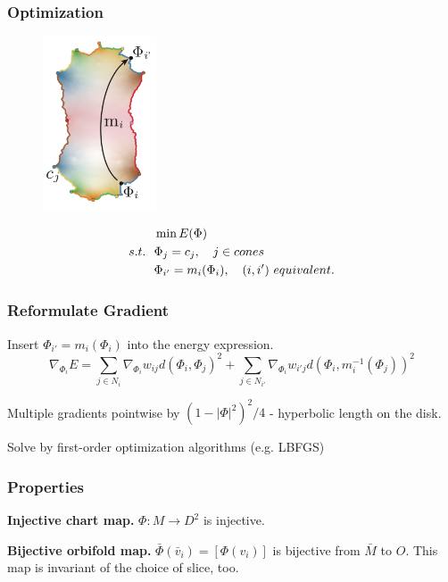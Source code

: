 \documentclass{beamer}
\begin{document}
\begin{frame}
\frametitle{Optimization}
\begin{figure}
\includegraphics[width=0.3\textwidth]{images/optimize-hyperbolic}
\end{figure}
\begin{equation}
\begin{split}
&\min E(\Phi)\\
s.t. \ \  & \Phi_j = c_j,\ \ \  \hfill j\in cones\\
&\Phi_{i'} = m_i(\Phi_i),\ \ \  \hfill(i, i')\ equivalent.
\end{split}
\nonumber
\end{equation}
\end{frame}

\begin{frame}
\frametitle{Reformulate Gradient}
Insert $\Phi_{i'} = m_i(\Phi_i)$ into the energy expression.
\begin{equation}
\nonumber
\nabla_{\Phi_i} E = \sum_{j\in N_i}\nabla_{\Phi_i}w_{ij}d(\Phi_i, \Phi_j)^2 + \sum_{j\in N_{i'}}\nabla_{\Phi_i}w_{i'j}d(\Phi_i, m_i^{-1}(\Phi_j))^2
\end{equation}

Multiple gradients pointwise by $(1 - |\Phi|^2)^2 / 4$ - hyperbolic length on the disk.

Solve by first-order optimization algorithms (e.g. LBFGS)
\end{frame}

\begin{frame}
\frametitle{Properties}
\textbf{Injective chart map.} $\Phi: M\rightarrow D^2$ is injective.

\textbf{Bijective orbifold map.}
$\bar{\Phi}(\bar{v}_i) = [\Phi(v_i)]$ is bijective from $\bar{M}$ to $\mathit{O}$.
This map is invariant of the choice of slice, too.


\end{frame}
\end{document}
